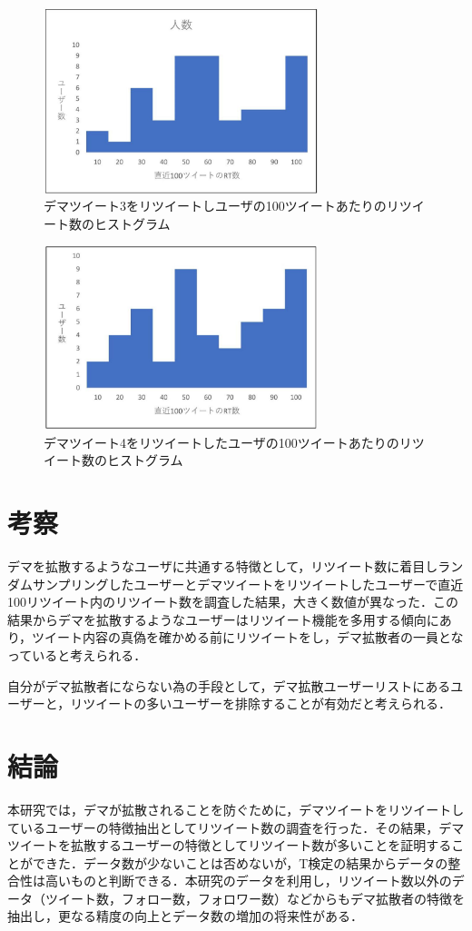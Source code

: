 \documentclass[uplatex,twocolumn]{jsarticle}
\begin{document}
\begin{figure}[htbp]
\centering
\includegraphics[clip,width=8.0cm]{d3.pdf}
\caption{デマツイート3をリツイートしユーザの100ツイートあたりのリツイート数のヒストグラム}
\label{ヒストグラム3}
\end{figure}

\begin{figure}[htbp]
\centering
\includegraphics[clip,width=8.0cm]{d4.pdf}
\caption{デマツイート4をリツイートしたユーザの100ツイートあたりのリツイート数のヒストグラム}
\label{ヒストグラム4}
\end{figure}

\section{考察}
デマを拡散するようなユーザに共通する特徴として，リツイート数に着目しランダムサンプリングしたユーザーとデマツイートをリツイートしたユーザーで直近100リツイート内のリツイート数を調査した結果，大きく数値が異なった．この結果からデマを拡散するようなユーザーはリツイート機能を多用する傾向にあり，ツイート内容の真偽を確かめる前にリツイートをし，デマ拡散者の一員となっていると考えられる．

自分がデマ拡散者にならない為の手段として，デマ拡散ユーザーリストにあるユーザーと，リツイートの多いユーザーを排除することが有効だと考えられる．

\section{結論}
本研究では，デマが拡散されることを防ぐために，デマツイートをリツイートしているユーザーの特徴抽出としてリツイート数の調査を行った．その結果，デマツイートを拡散するユーザーの特徴としてリツイート数が多いことを証明することができた．データ数が少ないことは否めないが，T検定の結果からデータの整合性は高いものと判断できる．本研究のデータを利用し，リツイート数以外のデータ（ツイート数，フォロー数，フォロワー数）などからもデマ拡散者の特徴を抽出し，更なる精度の向上とデータ数の増加の将来性がある．


\end{document}
